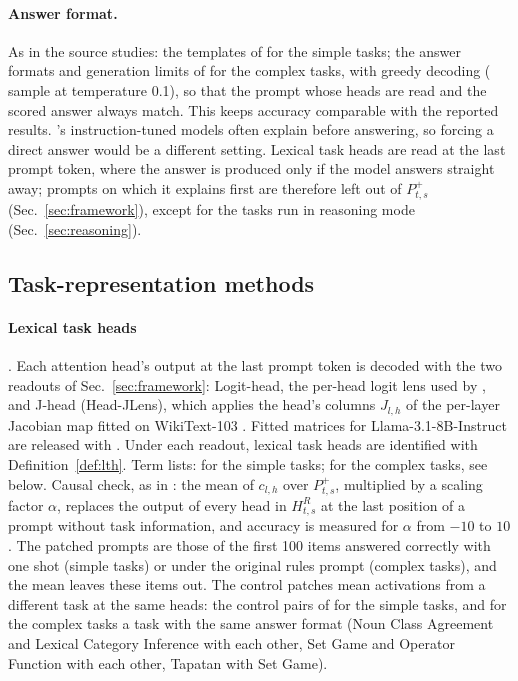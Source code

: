 \documentclass[11pt,a4paper]{article}
\begin{document}
\paragraph{Answer format.} As in the source studies: the templates of \citet{yang2026shared} for the simple tasks; the answer formats and generation limits of \citet[App.~A]{fu2026rules} for the complex tasks, with greedy decoding (\citeauthor{fu2026rules} sample at temperature 0.1), so that the prompt whose heads are read and the scored answer always match. This keeps accuracy comparable with the reported results. \citeauthor{fu2026rules}'s instruction-tuned models often explain before answering, so forcing a direct answer would be a different setting. Lexical task heads are read at the last prompt token, where the answer is produced only if the model answers straight away; prompts on which it explains first are therefore left out of $P^{+}_{t,s}$ (Sec.~\ref{sec:framework}), except for the tasks run in reasoning mode (Sec.~\ref{sec:reasoning}).

\subsection{Task-representation methods}\label{sec:trmethods}
\paragraph{Lexical task heads} \citep[Sec.~2.2.2]{yang2026shared}.
Each attention head's output at the last prompt token is decoded with the two readouts of Sec.~\ref{sec:framework}: Logit-head, the per-head logit lens used by \citet{yang2026shared} \citep{nostalgebraist2020logitlens}, and J-head (Head-JLens), which applies the head's columns $J_{l,h}$ of the per-layer Jacobian map fitted on WikiText-103 \citep[Sec.~2]{merlo2026headjlens}. Fitted matrices for Llama-3.1-8B-Instruct are released with \citet[Sec.~S4]{merlo2026headjlens}.
Under each readout, lexical task heads are identified with Definition~\ref{def:lth}.
Term lists: \citet[App.~A.2.1]{yang2026shared} for the simple tasks; for the complex tasks, see below.
Causal check, as in \citet[Sec.~2.3.2, App.~G]{yang2026shared}: the mean of $c_{l,h}$ over $P^{+}_{t,s}$, multiplied by a scaling factor $\alpha$, replaces the output of every head in $H^{R}_{t,s}$ at the last position of a prompt without task information, and accuracy is measured for $\alpha$ from $-10$ to $10$. The patched prompts are those of the first 100 items answered correctly with one shot (simple tasks) or under the original rules prompt (complex tasks), and the mean leaves these items out. The control patches mean activations from a different task at the same heads: the control pairs of \citet{yang2026shared} for the simple tasks, and for the complex tasks a task with the same answer format (Noun Class Agreement and Lexical Category Inference with each other, Set Game and Operator Function with each other, Tapatan with Set Game).
\end{document}
